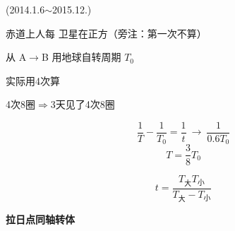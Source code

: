 (2014.1.6$\sim$2015.12.)
\begin{problem}
赤道上人每\,\,卫星在正方（旁注：第一次不算）

从 A$\to$B 用\quad 地球自转周期 $T_0$
\begin{solution}
\quad 实际用4次算

4次\quad 8圈\quad $\Longrightarrow$\quad 3天见了4次\quad 8圈

\quad {}

\[ \dfrac{1}{T}-\dfrac{1}{T_0}=\dfrac{1}{t}\ \to\ \dfrac{1}{0.6T_0} \]
\[ T=\dfrac{3}{8}T_0 \]

\[ t=\dfrac{T_{\text{大}}T_{\text{小}}}{T_{\text{大}}-T_{\text{小}}} \]
\end{solution}
\end{problem}
\textbf{拉日点}\quad\textbf{同轴转体}

